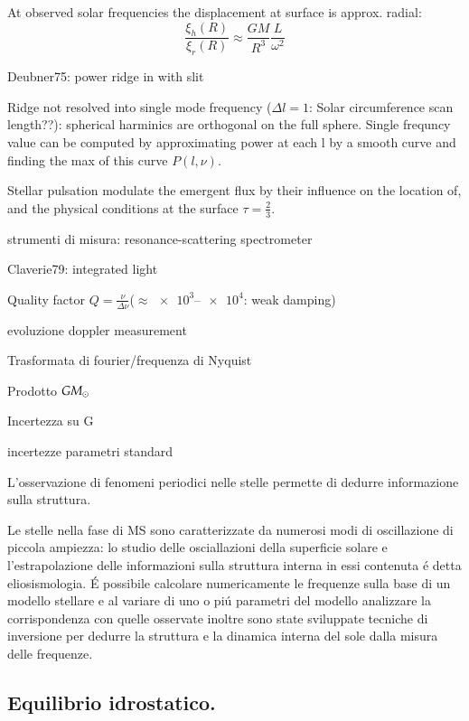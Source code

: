 \begin{itemize*}
\item At observed solar frequencies the displacement at surface is approx. radial:
\begin{equation*}
\frac{\xi_h(R)}{\xi_r(R)}\approx\frac{GM}{R^3}\frac{L}{\omega^2}
\end{equation*}

\item Deubner75: power ridge in \dgndi{} with slit
\item Ridge not resolved into single mode frequency ($\Delta l=1$: Solar circumference scan length??): spherical harminics are orthogonal on the full sphere. Single frequncy value can be computed by approximating power at each l by a smooth curve and finding the max of this curve $P(l,\nu)$.
\item Stellar pulsation modulate the emergent flux by their influence on the location of, and the physical conditions at the surface $\tau=\frac{2}{3}$.
\item strumenti di misura: resonance-scattering spectrometer
\item Claverie79: integrated light
\item Quality factor $Q=\frac{\nu}{\Delta\nu}$($\approx\numrange{e3}{e4}$: weak damping)
\item evoluzione doppler measurement
\item Trasformata di fourier/frequenza di Nyquist
\item Prodotto $GM_{\odot}$
\item Incertezza su G
\item incertezze parametri standard
\end{itemize*}


L'osservazione di fenomeni periodici nelle stelle permette di dedurre informazione sulla struttura.

Le stelle nella fase di MS  sono caratterizzate da numerosi modi di oscillazione di piccola ampiezza: lo studio delle osciallazioni della superficie solare e l'estrapolazione delle informazioni sulla struttura interna in essi contenuta \'e detta eliosismologia. \'E possibile calcolare numericamente le frequenze sulla base di un modello stellare e al variare di uno o pi\'u parametri del modello analizzare la corrispondenza con quelle osservate inoltre sono state sviluppate tecniche di inversione per dedurre la struttura e la dinamica interna del sole dalla misura delle frequenze.

\subsection{Equilibrio idrostatico.}

